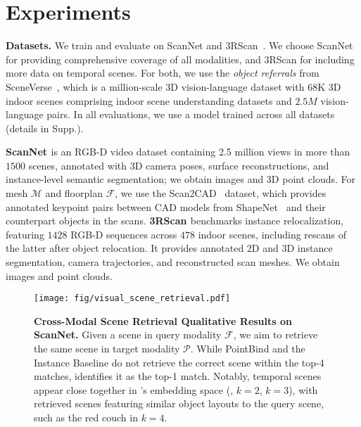 \section{Experiments}
\label{sec:experiment}

\textbf{Datasets.}
We train and evaluate \project{} on ScanNet \cite{dai2017scannet} and 3RScan~\cite{wald2019rio}. We choose ScanNet for providing comprehensive coverage of all modalities, and 3RScan for including more data on temporal scenes. For both, we use the \textit{object referrals} from SceneVerse~\cite{jia2024sceneverse}, which is a million-scale 3D vision-language dataset with $68$K 3D indoor scenes comprising indoor scene understanding datasets and $2.5M$ vision-language pairs. In all evaluations, we use a model trained across all datasets (details in Supp.).

\textbf{ScanNet \cite{dai2017scannet}} is an RGB-D video dataset containing 2.5 million views in more than $1500$ scenes, annotated with 3D camera poses, surface reconstructions, and instance-level semantic segmentation; we obtain images and 3D point clouds. For mesh $\mathcal{M}$ and floorplan $\mathcal{F}$, we use the Scan2CAD~\cite{Avetisyan_2019_CVPR} dataset, which provides annotated keypoint pairs between CAD models from ShapeNet~\cite{Chang2015ShapeNetAI} and their counterpart objects in the scans. \textbf{3RScan \cite{wald2019rio}} benchmarks instance relocalization, featuring $1428$ RGB-D sequences across $478$ indoor scenes, including rescans of the latter after object relocation. It provides annotated 2D and 3D instance segmentation, camera trajectories, and reconstructed scan meshes. We obtain images and point clouds.

\begin{figure*}
    \centering
    \texttt{[image: fig/visual\_scene\_retrieval.pdf]}
    \caption{\textbf{Cross-Modal Scene Retrieval Qualitative Results on ScanNet.} Given a scene in query modality $\mathcal{F}$, we aim to retrieve the same scene in target modality $\mathcal{P}$. While PointBind and the Instance Baseline do not retrieve the correct scene within the top-4 matches, \project{} identifies it as the top-1 match. Notably, temporal scenes appear close together in \project{}’s embedding space (\eg, $k=2$, $k=3$), with retrieved scenes featuring similar object layouts to the query scene, such as the red couch in $k=4$.}
    \label{fig:visual_comparison}
    \vspace{-10pt}
\end{figure*} 

